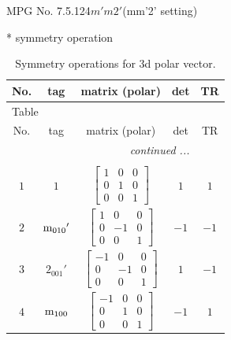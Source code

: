 \documentclass[fleqn,8pt]{jsarticle}
\begin{document}
\setcounter{MaxMatrixCols}{32}

\renewcommand{\tablename}{Table~}
\renewcommand{\figurename}{Figure~}
\begin{center}
\LARGE
MPG No. 7.5.124\quad$m'm2'$\quad(mm'2' setting)
\end{center}
* symmetry operation
\renewcommand{\arraystretch}{1.3}
\begin{longtable}{ccccc}
\caption{Symmetry operations for 3d polar vector.}
 \\
 \hline \hline
No. & tag & matrix (polar) & det & TR \\ \hline \endfirsthead

\multicolumn{4}{l}{\tablename\ \thetable{}} \\
 \hline \hline
No. & tag & matrix (polar) & det & TR \\ \hline \endhead

 \hline \hline
\multicolumn{4}{r}{\footnotesize\it continued ...} \\ \endfoot

 \hline \hline
\multicolumn{4}{r}{} \\ \endlastfoot

$ 1 $ & $ 1 $ & $ \begin{bmatrix} 1 & 0 & 0 \\ 0 & 1 & 0 \\ 0 & 0 & 1 \end{bmatrix} $ & $ 1 $ & $ 1 $ \\ \hline
$ 2 $ & $ {\rm m}_{010}{}' $ & $ \begin{bmatrix} 1 & 0 & 0 \\ 0 & -1 & 0 \\ 0 & 0 & 1 \end{bmatrix} $ & $ -1 $ & $ -1 $ \\ \hline
$ 3 $ & $ 2{}_{001}{}' $ & $ \begin{bmatrix} -1 & 0 & 0 \\ 0 & -1 & 0 \\ 0 & 0 & 1 \end{bmatrix} $ & $ 1 $ & $ -1 $ \\ \hline
$ 4 $ & $ {\rm m}_{100} $ & $ \begin{bmatrix} -1 & 0 & 0 \\ 0 & 1 & 0 \\ 0 & 0 & 1 \end{bmatrix} $ & $ -1 $ & $ 1 $ \\
\end{longtable}
\end{document}
